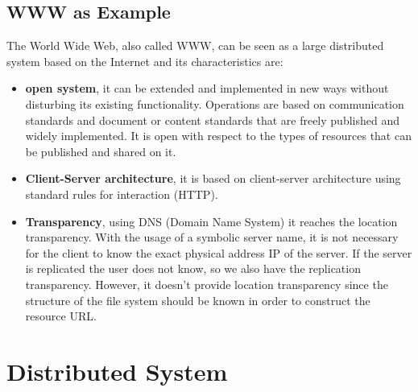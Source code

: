 \documentclass[11pt,a4paper]{article}
\begin{document}
\subsection{WWW as Example}
The World Wide Web, also called WWW, can be seen as a large distributed system based on the Internet and its characteristics are:
\begin{itemize}
    \item \textbf{open system}, it can be extended and implemented in new ways without disturbing its existing functionality. Operations are based on communication standards and document or content standards that are freely published and widely implemented. It is open with respect to the types of resources that can be published and shared on it.
    \item \textbf{Client-Server architecture}, it is based on client-server architecture using standard rules for interaction (HTTP).
    \item \textbf{Transparency}, using DNS (Domain Name System) it reaches the location transparency. With the usage of a symbolic server name, it is not necessary for the client to know the exact physical address IP of the server. If the server is replicated the user does not know, so we also have the replication transparency. However, it doesn't provide location transparency since the structure of the file system should be known in order to construct the resource URL.
\end{itemize}

\newpage

\section{Distributed System}
\end{document}
